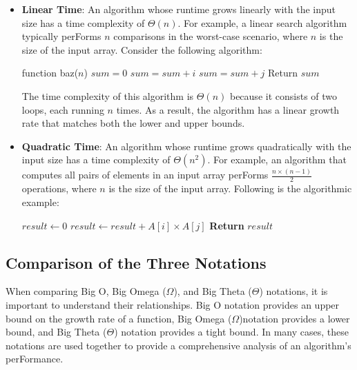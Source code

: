 \documentclass[12pt]{book} %
\begin{document}
\begin{itemize}
    \item \textbf{Linear Time}: An algorithm whose runtime grows linearly with the input size has a time complexity of \(\Theta(n)\). For example, a linear search algorithm typically perForms \(n\) comparisons in the worst-case scenario, where \(n\) is the size of the input array.
    \FloatBarrier
    Consider the following algorithm:
\FloatBarrier
\begin{algorithm}[H]
\caption{Example Algorithm For Big Theta (\(\Theta\)) Notation}
\begin{algorithmic}
\State function baz($n$)
\State $sum = 0$
\State $sum = sum + i$
\EndFor
{}
\State $sum = sum + j$
\EndFor
\State Return $sum$
\end{algorithmic}
\end{algorithm}
\FloatBarrier
The time complexity of this algorithm is $\Theta(n)$ because it consists of two loops, each running $n$ times. As a result, the algorithm has a linear growth rate that matches both the lower and upper bounds.
\FloatBarrier
    \item \textbf{Quadratic Time}: An algorithm whose runtime grows quadratically with the input size has a time complexity of \(\Theta(n^2)\). For example, an algorithm that computes all pairs of elements in an input array perForms \(\frac{n \times (n-1)}{2}\) operations, where \(n\) is the size of the input array.
    \FloatBarrier
    Following is the algorithmic example:
    \FloatBarrier
    \begin{algorithm}
\caption{Quadratic Time Algorithm}
\begin{algorithmic}[1]
    \State $result \gets 0$
            \State $result \gets result + A[i] \times A[j]$
        \EndFor
    \EndFor
    \State \textbf{Return} $result$
\EndFunction
\end{algorithmic}
\end{algorithm}
\end{itemize}

\subsection{Comparison of the Three Notations}

When comparing Big O, Big Omega (\(\Omega\)), and Big Theta (\(\Theta\)) notations, it is important to understand their relationships. Big O notation provides an upper bound on the growth rate of a function, Big Omega (\(\Omega\))notation provides a lower bound, and Big Theta (\(\Theta\)) notation provides a tight bound. In many cases, these notations are used together to provide a comprehensive analysis of an algorithm's perFormance.
\end{document}
